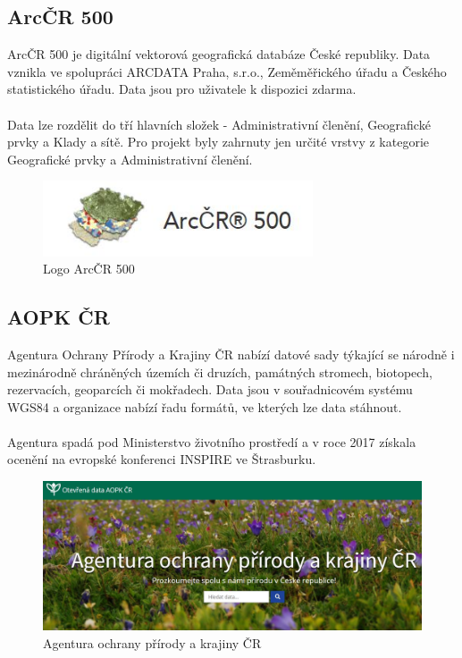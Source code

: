 \documentclass[a4paper, 12pt]{article}
\begin{document}
\subsection{ArcČR 500}
ArcČR 500 je digitální vektorová geografická databáze České republiky. Data vznikla ve spolupráci ARCDATA Praha, s.r.o., Zeměměřického úřadu a Českého statistického úřadu. Data jsou pro uživatele k dispozici zdarma. \\
\\
Data lze rozdělit do tří hlavních složek - Administrativní členění, Geografické prvky a Klady a sítě. Pro projekt byly zahrnuty jen určité vrstvy z kategorie Geografické prvky a Administrativní členění. 

\begin{figure}[h!]
	\centering
	\includegraphics[width=8cm]{pictures/arccr.jpg}
	\caption{Logo ArcČR 500}
\end{figure}

\subsection{AOPK ČR}
Agentura Ochrany Přírody a Krajiny ČR nabízí datové sady týkající se národně i mezinárodně chráněných územích či druzích, památných stromech, biotopech, rezervacích, geoparcích či mokřadech. Data jsou v souřadnicovém systému WGS84 a organizace nabízí řadu formátů, ve kterých lze data stáhnout.\\
\\
Agentura spadá pod Ministerstvo životního prostředí a v roce 2017 získala ocenění na evropské konferenci INSPIRE ve Štrasburku. 

\begin{figure}[h!]
	\centering
	\includegraphics[width=12cm]{pictures/aopk.jpg}
	\caption{Agentura ochrany přírody a krajiny ČR}
\end{figure}
\end{document}

